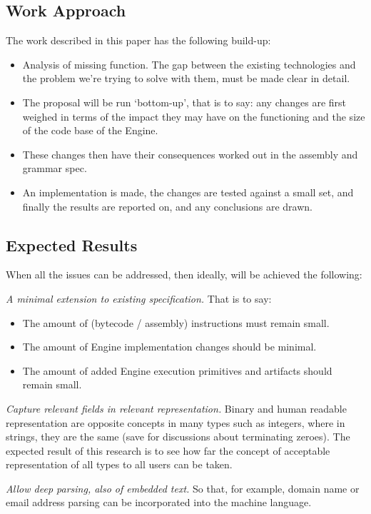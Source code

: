 \subsection{Work Approach}
The work described in this paper has the following build-up:

\begin{itemize}
    \item Analysis of missing function. The gap between the existing 
technologies and the problem we’re trying to solve with them, must be 
made clear in detail.
    \item The proposal will be run ‘bottom-up’, that is to say: any 
changes are first weighed in terms of the impact they may have on the 
functioning and the size of the code base of the Engine.
    \item These changes then have their consequences worked out in the 
assembly and grammar spec.
    \item An implementation is made, the changes are tested against a small 
set, and finally the results are reported on, and any conclusions are 
drawn.
\end{itemize}

\subsection{Expected Results}
When all the issues can be addressed, then ideally, will be achieved the 
following:

\textit{A minimal extension to existing specification.} That is to say:
\begin{itemize}
    \item The amount of (bytecode / assembly) instructions must remain small.
    \item The amount of Engine implementation changes should be minimal.
    \item The amount of added Engine execution primitives and artifacts 
should remain small.
\end{itemize}

\textit{Capture relevant fields in relevant representation.} Binary and human 
readable representation are opposite concepts in many types such as 
integers, where in strings, they are the same (save for discussions about 
terminating zeroes). The expected result of this research is to see how 
far the concept of acceptable representation of all types to all users can 
be taken.

\textit{Allow deep parsing, also of embedded text.} So that, for example,
domain name or email address parsing can be incorporated into the machine 
language.

